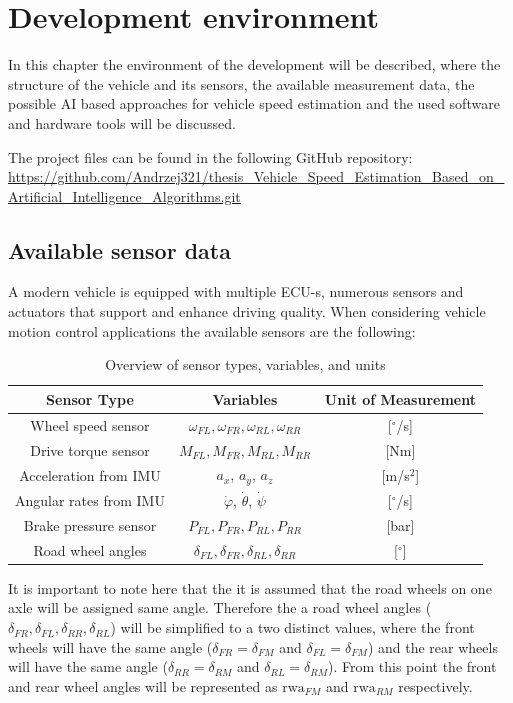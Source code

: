 \chapter{Development environment}

In this chapter the environment of the development will be described, where the structure of the vehicle and its sensors, the available measurement data, the possible AI based approaches for vehicle speed estimation and the used software and hardware tools will be discussed.

The project files can be found in the following GitHub repository: \url{https://github.com/Andrzej321/thesis_Vehicle_Speed_Estimation_Based_on_Artificial_Intelligence_Algorithms.git}

\section{Available sensor data}

A modern vehicle is equipped with multiple ECU-s, numerous sensors and actuators that support and enhance driving quality. When considering vehicle motion control applications the available sensors are the following:
\begin{table}[ht]
\centering
\begin{tabular}{|c|c|c|}
\hline 
\textbf{Sensor Type} & \textbf{Variables} & \textbf{Unit of Measurement} \\
\hline \hline
Wheel speed sensor & $\omega_{FL}, \omega_{FR}, \omega_{RL}, \omega_{RR}$ & [$^\circ$/s] \\
\hline
Drive torque sensor & $M_{FL}, M_{FR}, M_{RL}, M_{RR}$ & [Nm] \\
\hline
Acceleration from IMU & $a_x$, $a_y$, $a_z$ & [m/s$^2$] \\
\hline
Angular rates from IMU & $\dot{\varphi}$, $\dot{\theta}$, $\dot{\psi}$ & [$^\circ$/s] \\
\hline
Brake pressure sensor & $P_{FL}, P_{FR}, P_{RL}, P_{RR}$ & [bar] \\
\hline
Road wheel angles & $\delta_{FL}, \delta_{FR}, \delta_{RL}, \delta_{RR}$ & [$^\circ$] \\
\hline
\end{tabular}
\caption{Overview of sensor types, variables, and units}
\label{tab:sensor_table}
\end{table}

It is important to note here that the it is assumed that the road wheels on one axle will be assigned same angle. Therefore the a road wheel angles ($\delta_{FR}, \delta_{FL}, \delta_{RR}, \delta_{RL}$) will be simplified to a two distinct values, where the front wheels will have the same angle ($\delta_{FR} =  \delta_{FM}$ and $\delta_{FL} = \delta_{FM}$) and the rear wheels will have the same angle ($\delta_{RR} =  \delta_{RM}$ and $\delta_{RL} = \delta_{RM}$). From this point the front and rear wheel angles will be represented as $\text{rwa}_{FM}$ and $\text{rwa}_{RM}$ respectively.

